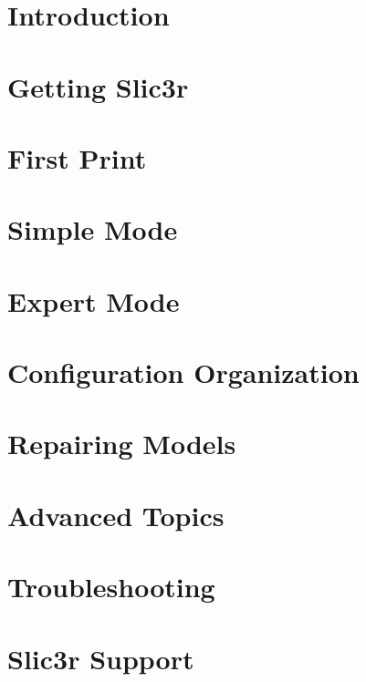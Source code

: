 %
%
%
%
%

\section{Introduction}


\section{Getting Slic3r}


\section{First Print}


\section{Simple Mode}


\section{Expert Mode}


\section{Configuration Organization}


\section{Repairing Models}


\section{Advanced Topics}


\section{Troubleshooting}


\section{Slic3r Support}


